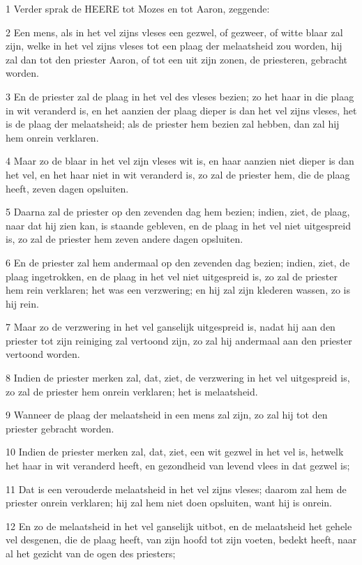 \par 1 Verder sprak de HEERE tot Mozes en tot Aaron, zeggende:
\par 2 Een mens, als in het vel zijns vleses een gezwel, of gezweer, of witte blaar zal zijn, welke in het vel zijns vleses tot een plaag der melaatsheid zou worden, hij zal dan tot den priester Aaron, of tot een uit zijn zonen, de priesteren, gebracht worden.
\par 3 En de priester zal de plaag in het vel des vleses bezien; zo het haar in die plaag in wit veranderd is, en het aanzien der plaag dieper is dan het vel zijns vleses, het is de plaag der melaatsheid; als de priester hem bezien zal hebben, dan zal hij hem onrein verklaren.
\par 4 Maar zo de blaar in het vel zijn vleses wit is, en haar aanzien niet dieper is dan het vel, en het haar niet in wit veranderd is, zo zal de priester hem, die de plaag heeft, zeven dagen opsluiten.
\par 5 Daarna zal de priester op den zevenden dag hem bezien; indien, ziet, de plaag, naar dat hij zien kan, is staande gebleven, en de plaag in het vel niet uitgespreid is, zo zal de priester hem zeven andere dagen opsluiten.
\par 6 En de priester zal hem andermaal op den zevenden dag bezien; indien, ziet, de plaag ingetrokken, en de plaag in het vel niet uitgespreid is, zo zal de priester hem rein verklaren; het was een verzwering; en hij zal zijn klederen wassen, zo is hij rein.
\par 7 Maar zo de verzwering in het vel ganselijk uitgespreid is, nadat hij aan den priester tot zijn reiniging zal vertoond zijn, zo zal hij andermaal aan den priester vertoond worden.
\par 8 Indien de priester merken zal, dat, ziet, de verzwering in het vel uitgespreid is, zo zal de priester hem onrein verklaren; het is melaatsheid.
\par 9 Wanneer de plaag der melaatsheid in een mens zal zijn, zo zal hij tot den priester gebracht worden.
\par 10 Indien de priester merken zal, dat, ziet, een wit gezwel in het vel is, hetwelk het haar in wit veranderd heeft, en gezondheid van levend vlees in dat gezwel is;
\par 11 Dat is een verouderde melaatsheid in het vel zijns vleses; daarom zal hem de priester onrein verklaren; hij zal hem niet doen opsluiten, want hij is onrein.
\par 12 En zo de melaatsheid in het vel ganselijk uitbot, en de melaatsheid het gehele vel desgenen, die de plaag heeft, van zijn hoofd tot zijn voeten, bedekt heeft, naar al het gezicht van de ogen des priesters;
